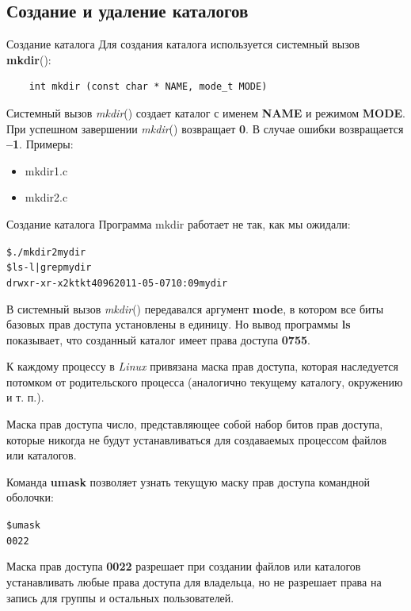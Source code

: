 \documentclass[xcolor=table]{beamer}
\begin{document}
\subsection{Создание и удаление каталогов}

\begin{frame}[fragile]{Создание каталога}
	Для создания каталога используется системный вызов \textbf{mkdir}():
	\begin{verbatim}
	int mkdir (const char * NAME, mode_t MODE)
	\end{verbatim}
	Системный вызов \textit{mkdir}() создает каталог с именем \textbf{NAME} и режимом \textbf{MODE}. При успешном завершении \textit{mkdir}() возвращает \textbf{0}. В случае ошибки возвращается \textbf{–1}. Примеры: 
	\begin{itemize}
		\item mkdir1.c
		\item mkdir2.c
	\end{itemize}
\end{frame}

\begin{frame}[fragile]{Создание каталога}
	Программа mkdir работает не так, как мы ожидали:
	\begin{alltt}
		\$ ./mkdir2 mydir
		\$ ls -l | grep mydir
		drwxr-xr-x 2 kt kt 4096 2011-05-07 10:09 mydir
	\end{alltt}
	В системный вызов \textit{mkdir}() передавался аргумент \textbf{mode}, в котором все биты базовых прав доступа установлены в единицу. Но вывод программы \textbf{ls} показывает, что созданный каталог имеет права доступа \textbf{0755}.
\end{frame}

\begin{frame}[fragile]
	К каждому процессу в \textit{Linux} привязана маска прав доступа, которая наследуется потомком от родительского процесса (аналогично текущему каталогу, окружению и т. п.). 
	\begin{block}{Маска прав доступа}
		число, представляющее собой набор битов прав доступа, которые никогда не будут устанавливаться для создаваемых процессом файлов или 	каталогов.
	\end{block}
	Команда \textbf{umask} позволяет узнать текущую маску прав доступа командной оболочки:
	\begin{alltt}
		\$ umask
		0022
	\end{alltt}
	Маска прав доступа \textbf{0022} разрешает при создании файлов или каталогов устанавливать любые права доступа для владельца, но не разрешает права на запись для группы и остальных пользователей.
\end{frame}
\end{document}
